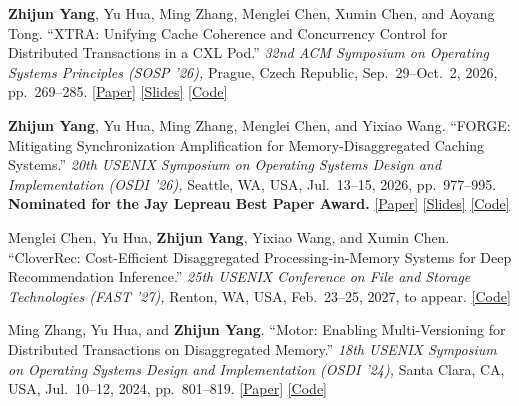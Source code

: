 \documentclass[a4paper,11pt]{article}
\newcommand{\resumelink}[2]{\href{#1}{[#2]}}
\begin{document}
\begin{enumerate}[
  leftmargin=1.55em,
  label={[\arabic*]},
  itemsep=0.42em,
  topsep=0.05em,
  parsep=0pt,
  partopsep=0pt
]

\item
  \textbf{Zhijun Yang}, Yu Hua, Ming Zhang, Menglei Chen, Xumin Chen, and Aoyang Tong.
  ``XTRA: Unifying Cache Coherence and Concurrency Control for Distributed Transactions in a CXL Pod.''
  \textit{32nd ACM Symposium on Operating Systems Principles (SOSP '26),}
  Prague, Czech Republic, Sep.~29--Oct.~2, 2026, pp.~269--285.
  \resumelink{https://cszjyang.github.io/publications/2026/xtra/SOSP26-XTRA-paper.pdf}{Paper}
  \resumelink{https://cszjyang.github.io/publications/2026/xtra/SOSP26-XTRA-slides.pdf}{Slides}
  \resumelink{https://github.com/cszjyang/xtra}{Code}

\item
  \textbf{Zhijun Yang}, Yu Hua, Ming Zhang, Menglei Chen, and Yixiao Wang.
  ``FORGE: Mitigating Synchronization Amplification for Memory-Disaggregated Caching Systems.''
  \textit{20th USENIX Symposium on Operating Systems Design and Implementation (OSDI '26),}
  Seattle, WA, USA, Jul.~13--15, 2026, pp.~977--995.
  \textbf{Nominated for the Jay Lepreau Best Paper Award.}
  \resumelink{https://cszjyang.github.io/publications/2026/forge/OSDI26-FORGE-paper.pdf}{Paper}
  \resumelink{https://cszjyang.github.io/publications/2026/forge/OSDI26-FORGE-slides.pdf}{Slides}
  \resumelink{https://github.com/cszjyang/forge}{Code}

\item
  Menglei Chen, Yu Hua, \textbf{Zhijun Yang}, Yixiao Wang, and Xumin Chen.
  ``CloverRec: Cost-Efficient Disaggregated Processing-in-Memory Systems for Deep Recommendation Inference.''
  \textit{25th USENIX Conference on File and Storage Technologies (FAST '27),}
  Renton, WA, USA, Feb.~23--25, 2027, to appear.
  \resumelink{https://github.com/LighT-chenml/CloverRec}{Code}

\item
  Ming Zhang, Yu Hua, and \textbf{Zhijun Yang}.
  ``Motor: Enabling Multi-Versioning for Distributed Transactions on Disaggregated Memory.''
  \textit{18th USENIX Symposium on Operating Systems Design and Implementation (OSDI '24),}
  Santa Clara, CA, USA, Jul.~10--12, 2024, pp.~801--819.
  \resumelink{https://www.usenix.org/conference/osdi24/presentation/zhang-ming}{Paper}
  \resumelink{https://github.com/minghust/motor}{Code}

\end{enumerate}
\end{document}
